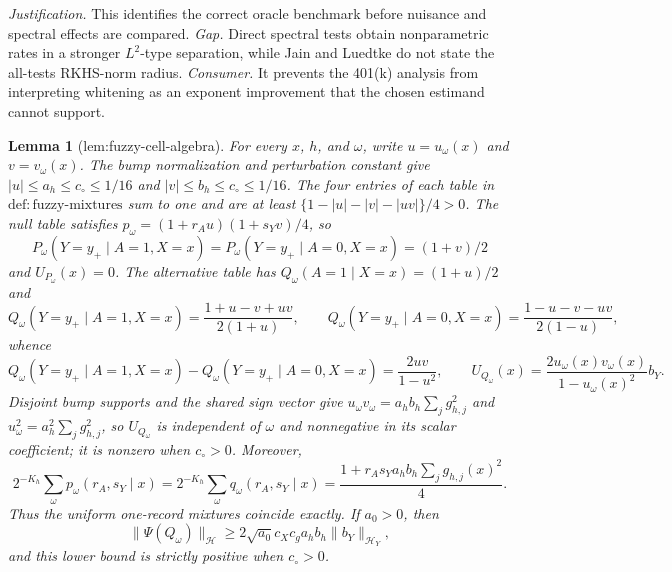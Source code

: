 \documentclass{article}
\newtheorem{lemma}{Lemma}
\begin{document}
\par\smallskip\noindent \textit{Justification.} This identifies the correct oracle benchmark before nuisance and spectral effects are compared. \textit{Gap.} Direct spectral tests obtain nonparametric rates in a stronger \(L^2\)-type separation, while Jain and Luedtke do not state the all-tests RKHS-norm radius. \textit{Consumer.} It prevents the 401(k) analysis from interpreting whitening as an exponent improvement that the chosen estimand cannot support.

\begin{lemma}[lem:fuzzy-cell-algebra]\label{lem:fuzzy-cell-algebra}
For every \(x\), \(h\), and \(\omega\), write \(u=u_\omega(x)\) and \(v=v_\omega(x)\). The bump normalization and perturbation constant give \(|u|\le a_h\le c_\circ\le1/16\) and \(|v|\le b_h\le c_\circ\le1/16\). The four entries of each table in \(\mathrm{def{:}fuzzy\mbox{-}mixtures}\) sum to one and are at least \(\{1-|u|-|v|-|uv|\}/4>0\). The null table satisfies \(p_\omega=(1+r_Au)(1+s_Yv)/4\), so
\[
P_\omega(Y=y_+\mid A=1,X=x)=P_\omega(Y=y_+\mid A=0,X=x)=(1+v)/2
\]
and \(U_{P_\omega}(x)=0\). The alternative table has \(Q_\omega(A=1\mid X=x)=(1+u)/2\) and
\[
Q_\omega(Y=y_+\mid A=1,X=x)=\frac{1+u-v+uv}{2(1+u)},\qquad
Q_\omega(Y=y_+\mid A=0,X=x)=\frac{1-u-v-uv}{2(1-u)},
\]
whence
\[
Q_\omega(Y=y_+\mid A=1,X=x)-Q_\omega(Y=y_+\mid A=0,X=x)
=\frac{2uv}{1-u^2},\qquad
U_{Q_\omega}(x)=\frac{2u_\omega(x)v_\omega(x)}{1-u_\omega(x)^2}b_Y.
\]
Disjoint bump supports and the shared sign vector give \(u_\omega v_\omega=a_hb_h\sum_jg_{h,j}^2\) and \(u_\omega^2=a_h^2\sum_jg_{h,j}^2\), so \(U_{Q_\omega}\) is independent of \(\omega\) and nonnegative in its scalar coefficient; it is nonzero when \(c_\circ>0\). Moreover,
\[
2^{-K_h}\sum_\omega p_\omega(r_A,s_Y\mid x)
=2^{-K_h}\sum_\omega q_\omega(r_A,s_Y\mid x)
=\frac{1+r_As_Ya_hb_h\sum_jg_{h,j}(x)^2}{4}.
\]
Thus the uniform one-record mixtures coincide exactly. If \(a_0>0\), then
\[
\|\Psi(Q_\omega)\|_{\mathcal H}
\ge2\sqrt{a_0}c_Xc_ga_hb_h\|b_Y\|_{\mathcal H_Y},
\]
and this lower bound is strictly positive when \(c_\circ>0\).
\end{lemma}
\end{document}
